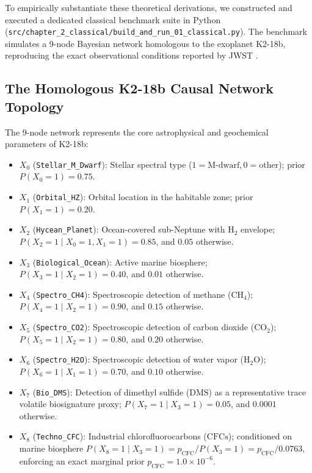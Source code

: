 To empirically substantiate these theoretical derivations, we constructed and executed a dedicated classical benchmark suite in Python (\texttt{src/chapter\_2\_classical/build\_and\_run\_01\_classical.py}). The benchmark simulates a 9-node Bayesian network homologous to the exoplanet K2-18b, reproducing the exact observational conditions reported by JWST \cite{madhusudhan2023}.

\subsection{The Homologous K2-18b Causal Network Topology}
The 9-node network represents the core astrophysical and geochemical parameters of K2-18b:
\begin{itemize}
    \item $X_0$ (\texttt{Stellar\_M\_Dwarf}): Stellar spectral type ($1 = \text{M-dwarf}, 0 = \text{other}$); prior $P(X_0 = 1) = 0.75$.
    \item $X_1$ (\texttt{Orbital\_HZ}): Orbital location in the habitable zone; prior $P(X_1 = 1) = 0.20$.
    \item $X_2$ (\texttt{Hycean\_Planet}): Ocean-covered sub-Neptune with $\mathrm{H}_2$ envelope; $P(X_2 = 1 \mid X_0=1, X_1=1) = 0.85$, and $0.05$ otherwise.
    \item $X_3$ (\texttt{Biological\_Ocean}): Active marine biosphere; $P(X_3 = 1 \mid X_2=1) = 0.40$, and $0.01$ otherwise.
    \item $X_4$ (\texttt{Spectro\_CH4}): Spectroscopic detection of methane ($\mathrm{CH}_4$); $P(X_4 = 1 \mid X_2=1) = 0.90$, and $0.15$ otherwise.
    \item $X_5$ (\texttt{Spectro\_CO2}): Spectroscopic detection of carbon dioxide ($\mathrm{CO}_2$); $P(X_5 = 1 \mid X_2=1) = 0.80$, and $0.20$ otherwise.
    \item $X_6$ (\texttt{Spectro\_H2O}): Spectroscopic detection of water vapor ($\mathrm{H}_2\mathrm{O}$); $P(X_6 = 1 \mid X_1=1) = 0.70$, and $0.10$ otherwise.
    \item $X_7$ (\texttt{Bio\_DMS}): Detection of dimethyl sulfide ($\mathrm{DMS}$) as a representative trace volatile biosignature proxy; $P(X_7 = 1 \mid X_3=1) = 0.05$, and $0.0001$ otherwise.
    \item $X_8$ (\texttt{Techno\_CFC}): Industrial chlorofluorocarbons ($\mathrm{CFCs}$); conditioned on marine biosphere $P(X_8 = 1 \mid X_3=1) = p_{\mathrm{CFC}} / P(X_3=1) = p_{\mathrm{CFC}} / 0.0763$, enforcing an exact marginal prior $p_{\mathrm{CFC}} = 1.0 \times 10^{-6}$.
\end{itemize}

